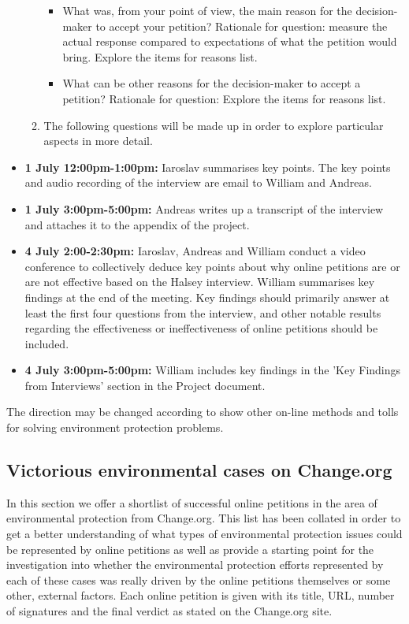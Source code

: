 \begin{itemize}
\begin{enumerate}[label*=\arabic*.]
\begin{itemize}
\item What was, from your point of view, the main reason for the decision-maker to accept your petition?
Rationale for question: measure the actual response compared to expectations of what the petition would bring. Explore the items for reasons list.
\item What can be other reasons for the decision-maker to accept a petition?
Rationale for question: Explore the items for reasons list.
\end{itemize}
\item
The following questions will be made up in order to explore particular aspects in more detail. 
\end{enumerate}
\item  \textbf{1 July 12:00pm-1:00pm:} Iaroslav summarises key points. The key points and audio recording of the interview are email to William and Andreas.
\item \textbf{1 July 3:00pm-5:00pm:} Andreas writes up a transcript of the interview and attaches it to the appendix of the project.
\item  \textbf{4 July 2:00-2:30pm:} Iaroslav, Andreas and William conduct a video conference to collectively deduce key points about why online petitions are or are not effective based on the Halsey interview. William summarises key findings at the end of the meeting. Key findings should primarily answer at least the first four questions from the interview, and other notable results regarding the effectiveness or ineffectiveness of online petitions should be included.
\item  \textbf{4 July 3:00pm-5:00pm:} William includes key findings in the 'Key Findings from Interviews' section in the Project document.
\end{itemize}


The direction may be changed according to show other on-line methods and tolls for solving environment protection problems. 


\subsection{Victorious environmental cases on Change.org}
\label{subsec:VictoriousCases}
In this section we offer a shortlist of successful online petitions in the area of environmental protection from Change.org. This list has been collated in order to get a better understanding of what types of environmental protection issues could be represented by online petitions as well as provide a starting point for the investigation into whether the environmental protection efforts represented by each of these cases was really driven by the online petitions themselves or some other, external factors. Each online petition is given with its title, URL, number of signatures and the final verdict as stated on the Change.org site.

